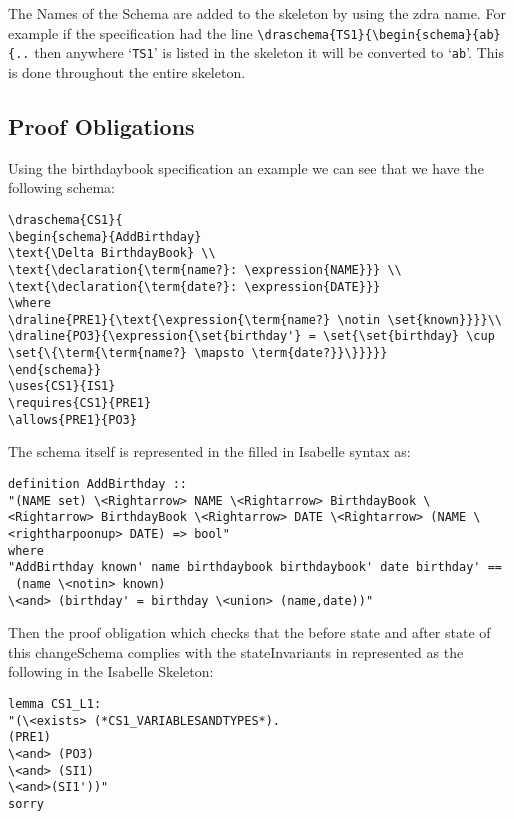The Names of the Schema are added to the skeleton by using the \gls{zdra} name. For example if the specification had the line \verb|\draschema{TS1}{\begin{schema}{ab}{..| then anywhere `\texttt{TS1}' is listed in the skeleton it will be converted to `\texttt{ab}'. This is done throughout the entire skeleton.

\subsection{Proof Obligations}

Using the birthdaybook specification an example we can see that we have the following schema:

\begin{verbatim}
\draschema{CS1}{
\begin{schema}{AddBirthday}
\text{\Delta BirthdayBook} \\
\text{\declaration{\term{name?}: \expression{NAME}}} \\
\text{\declaration{\term{date?}: \expression{DATE}}}
\where
\draline{PRE1}{\text{\expression{\term{name?} \notin \set{known}}}}\\
\draline{PO3}{\expression{\set{birthday'} = \set{\set{birthday} \cup \set{\{\term{\term{name?} \mapsto \term{date?}}\}}}}}
\end{schema}}
\uses{CS1}{IS1}
\requires{CS1}{PRE1}
\allows{PRE1}{PO3}
\end{verbatim}

The schema itself is represented in the filled in Isabelle syntax as:

\begin{verbatim}
definition AddBirthday :: 
"(NAME set) \<Rightarrow> NAME \<Rightarrow> BirthdayBook \<Rightarrow> BirthdayBook \<Rightarrow> DATE \<Rightarrow> (NAME \<rightharpoonup> DATE) => bool"
where 
"AddBirthday known' name birthdaybook birthdaybook' date birthday' ==
 (name \<notin> known)
\<and> (birthday' = birthday \<union> (name,date))"
\end{verbatim}

Then the proof obligation which checks that the before state and after state of this changeSchema complies with the stateInvariants in represented as the following in the Isabelle Skeleton:

\begin{verbatim}
lemma CS1_L1:
"(\<exists> (*CS1_VARIABLESANDTYPES*).
(PRE1)
\<and> (PO3)
\<and> (SI1)
\<and>(SI1'))"
sorry
\end{verbatim}

